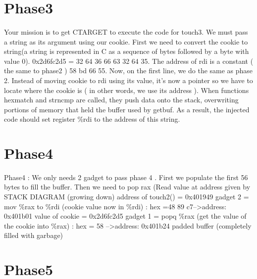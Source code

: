 \documentclass[a4paper]{article}
\begin{document}
\section{Phase3}

\paragraph{}
Your mission is to get CTARGET to execute the code for touch3. We must pass a string as its argument using our cookie. 
First we need to convert the cookie to string(a string is represented in C as a sequence of bytes followed by a byte with value 0). 0x2d6fc2d5 = 32 64 36 66 63 32 64 35. The address of rdi is a constant ( the same to phase2 ) 58 bd 66 55. Now, on the first line, we do the same as phase 2. Instead of moving cookie to rdi using its value, it's now a pointer so we have to locate where the cookie is ( in other words, we use its address ). When functions hexmatch and strncmp are called, they push data onto the stack, overwriting portions of memory that held the buffer used by getbuf.  As a result,  the injected code should set register \%rdi to the address of this string.



\section{Phase4}

\paragraph{}
Phase4 : 
We only needs 2 gadget to pass phase 4 . First we populate the first 56 bytes to fill the buffer. Then we need to pop rax (Read value at address given by %
STACK DIAGRAM (growing down)
address of touch2() = 0x401949
gadget 2 = mov \%rax to \%rdi  (cookie value now in \%rdi) : hex =48 89 c7--\textgreater address: 0x401b01
value of cookie = 0x2d6fc2d5
gadget 1 = popq \%rax (get the value of the cookie into \%rax) : hex = 58 --\textgreater address: 0x401b24
padded buffer (completely filled with garbage)

\section{Phase5}
\end{document}
